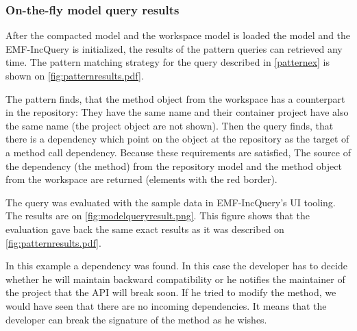 
\subsubsection{On-the-fly model query results}
After the compacted  model and the workspace model is loaded the model and the
EMF-IncQuery is initialized, the results of the pattern queries can retrieved
any time. The pattern matching strategy for the query described in \autoref{patternex} is
shown on \autoref{fig:patternresults.pdf}.

The pattern finds, that the  method object from the workspace has
a counterpart in the repository: They have the same name and their container
project have also the same name (the project object are not shown). Then the
query finds, that there is a dependency which point on the 
object at the repository as the target of a method call dependency. Because
these requirements are satisfied, The source of the dependency (the 
method) from the repository model and the  method object from the
workspace are returned (elements with the red border).
 
The query was evaluated with the sample data in EMF-IncQuery's UI tooling. The
results are on \autoref{fig:modelqueryresult.png}.
This figure shows that the evaluation gave back the same exact results as it was
described on \autoref{fig:patternresults.pdf}.

In this example a dependency was found. In this case the developer 
has to decide whether he will maintain backward compatibility or he notifies the
maintainer of the  project that the API will break soon. If he tried
to modify the  method, we would have seen that there are no incoming
dependencies. It means that the developer can break the signature of the method as
he wishes. 






